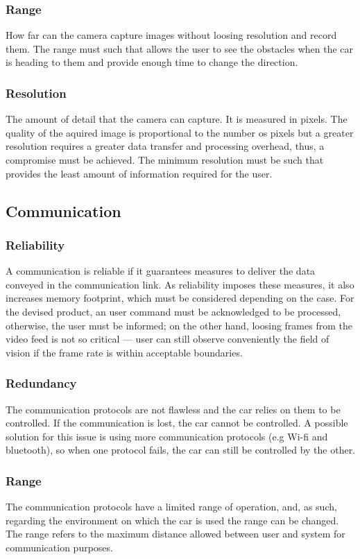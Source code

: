 \subsubsection{Range}%
\label{sec:orgecb044c}
How far can the camera capture images without loosing resolution and record them. The range must such that allows the user to see the obstacles when the car is heading to them and provide enough time to change the direction.
\subsubsection{Resolution}%
\label{sec:orgba87554}%
The amount of detail that the camera can capture. It is measured in pixels. The quality of the aquired image is proportional to the number os pixels but a greater resolution requires a greater data transfer and processing overhead, thus, a compromise must be achieved. The minimum resolution must be such that provides the least amount of information required for the user. 
\subsection{Communication}%
\label{sec:org4241610}
\subsubsection{Reliability}%
\label{sec:orgdcb920d}
A communication is reliable if it guarantees measures to deliver the data
conveyed in the communication link. As reliability imposes these measures, it
also increases memory footprint, which must be considered
depending on the case. For the devised product, an user command
must be acknowledged to be processed, otherwise, the user must be informed; on
the other hand, loosing frames from the video feed is not so critical — user can
still observe conveniently the ﬁeld of vision if the frame rate is within
acceptable boundaries.
\subsubsection{Redundancy}
\label{sec:orgc5933fc}
The communication protocols are not flawless and the car relies on them to be controlled. If the communication is lost, the car cannot be controlled. A possible solution for this issue is using more communication protocols (e.g Wi-fi and bluetooth), so when one protocol fails, the car can still be controlled by the other.
\subsubsection{Range}%
\label{sec:org447a205}
The communication protocols have a limited range of operation, and, as such, regarding the environment on which the car is used the range can be changed.
The range refers to the maximum distance allowed between user and system for communication purposes.
